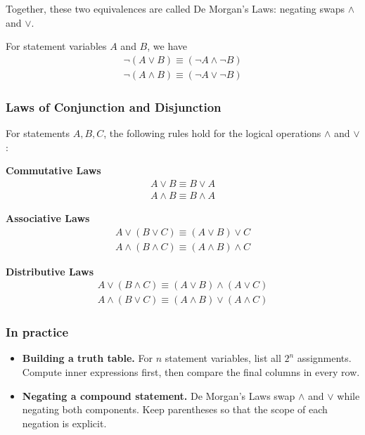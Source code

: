 Together, these two equivalences are called De Morgan's Laws: negating swaps $\wedge$ and $\vee$.
\begin{theorem}
    For statement variables $A$ and $B$, we have
    \begin{align*}
         \neg (A \vee B) \equiv (\neg A \wedge \neg B) \\
        \neg (A \wedge B) \equiv (\neg A \vee \neg B)
    \end{align*}
\end{theorem}

\subsubsection{Laws of Conjunction and Disjunction}
\begin{proposition}
    For statements $A, B, C$, the following rules hold for the logical operations $\wedge$ and $\vee$: 

    \textbf{Commutative Laws}
    \begin{align*}
        A \vee B \equiv B \vee A \\
        A \wedge B \equiv B \wedge A
    \end{align*}

    \textbf{Associative Laws}
    \begin{align*}
        A \vee (B \vee C) \equiv (A \vee B) \vee C \\ 
        A \wedge (B \wedge C) \equiv (A \wedge B) \wedge C
    \end{align*}

    \textbf{Distributive Laws}
    \begin{align*}
        A \vee (B \wedge C) \equiv (A \vee B) \wedge (A \vee C) \\ 
        A \wedge (B \vee C) \equiv (A \wedge B) \vee (A \wedge C)
    \end{align*}

\end{proposition}

\subsubsection*{In practice}
\begin{itemize}
    \item \textbf{Building a truth table.} For $n$ statement variables,
    list all $2^n$ assignments. Compute inner expressions first, then compare
    the final columns in every row.
    \item \textbf{Negating a compound statement.} De Morgan's Laws swap
    $\wedge$ and $\vee$ while negating both components. Keep parentheses so
    that the scope of each negation is explicit.
\end{itemize}
